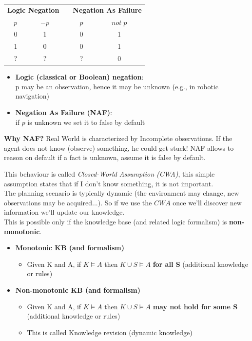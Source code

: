 \begin{table}[H]
    \centering
    \begin{tabular}{cclcc}
    \multicolumn{2}{c}{{\color[HTML]{000000} \textbf{Logic Negation}}} &  & \multicolumn{2}{c}{\textbf{Negation As Failure}}             \\
    {\color[HTML]{FD6864} $p$}      & {\color[HTML]{FD6864} $-p$}      &  & {\color[HTML]{FD6864} $p$} & {\color[HTML]{FD6864} $not\;p$} \\
    0 & 1 &  & 0 & 1 \\
    1 & 0 &  & 0 & 1 \\
    ? & ? &  & ? & 0
    \end{tabular}
\end{table}

\begin{itemize}
    \item \textbf{Logic (classical or Boolean) negation}:\\
    p may be an observation, hence it may be unknown (e.g., in robotic navigation)

    \item  \textbf{Negation As Failure (NAF)}:\\
    if $p$ is unknown we set it to false by default
\end{itemize}

\textbf{Why NAF?}
Real World is characterized by Incomplete observations. If the agent does not know (observe) something, he could get stuck!
NAF allows to reason on default if a fact is unknown, assume it is false by default.

This behaviour is called \emph{Closed-World Assumption (CWA)}, this simple assumption states that if I don't know something, it is not important.\\

The planning scenario is typically dynamic (the environment may change, new observations may be acquired...).
So if we use the $CWA$ once we'll discover new information we'll update our knowledge.\\

This is possible only if the knowledge base (and related logic formalism) is \textbf{non-monotonic}.

\begin{itemize}
    \item \textbf{Monotonic KB (and formalism)}
    \begin{itemize}
        \item Given K and A, if $K \models A$ then $K \cup S \models A$ \textbf{for all S} (additional knowledge or
        rules)
    \end{itemize}
    \item \textbf{Non-monotonic KB (and formalism)}
    \begin{itemize}
        \item Given K and A, if $K \models A$ then $K \cup S \models A$ \textbf{may not hold for some S} (additional knowledge or rules)
        \item This is called Knowledge revision (dynamic knowledge)
    \end{itemize}
\end{itemize}

